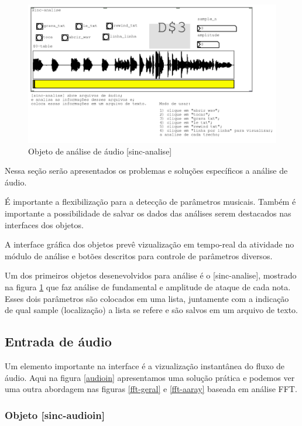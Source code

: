 \documentclass{ppgmus}
\begin{document}
\begin{figure}
\includegraphics[scale=.5]{sinc-analise}
\caption{Objeto de análise de áudio [sinc-analise]}
\label{sinc-analise}
\end{figure}


Nessa seção serão apresentados os problemas e soluções específicos
a análise de áudio. 

É importante a flexibilização para a detecção de parâmetros musicais.
Também é importante a possibilidade de salvar os dados das análises serem
destacados nas interfaces dos objetos.

A interface gráfica dos objetos prevê vizualização em tempo-real
da atividade no módulo de análise e botões descritos para controle
de parâmetros diversos.

Um dos primeiros objetos desenevolvidos para análise é o [sinc-analise],
mostrado na figura \ref{sinc-analise} que faz análise de fundamental e amplitude
de ataque de cada nota. Esses dois parâmetros são colocados em uma lista, juntamente com a indicação
de qual sample (localização) a lista se refere e são salvos em um arquivo de texto.



\subsection{Entrada de áudio}

Um elemento importante na interface é a vizualização instantânea
do fluxo de áudio. Aqui na figura \ref{audioin} apresentamos uma solução prática e podemos
ver uma outra abordagem nas figuras \ref{fft-geral} e \ref{fft-aaray} baseada em análise FFT.

\subsubsection{Objeto [sinc-audioin]}
\end{document}
